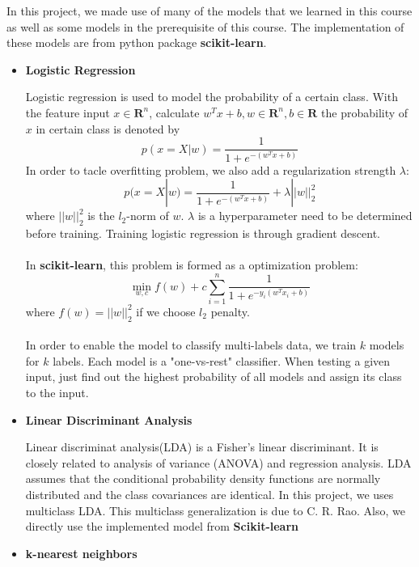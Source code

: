 \documentclass[11.5pt]{article}
\begin{document}
\begin{enumerate}
        In this project, we made use of many of the models that we learned in this course as well as some models in the prerequisite of this course. The implementation of these models are from python package \textbf{scikit-learn}\cite{scikit-learn}. 
            \begin{itemize}
                \item \textbf{Logistic Regression}
                
                Logistic regression is used to model the probability of a certain class. With the feature input $x \in \mathbf{R}^n$, calculate $w^Tx + b, w \in \mathbf{R}^n, b \in \mathbf{R}$ the probability of $x$ in certain class is denoted by 
                $$p(x = X | w) = \frac{1}{1 + e^{-(w^Tx + b)}}$$
                In order to tacle overfitting problem, we also add a regularization strength $\lambda$:
                $$p(x = X | w) = \frac{1}{1 + e^{-(w^Tx + b)}} + \lambda ||w||^2_2$$
                where $||w||_2^2$ is the $l_2$-norm of $w$. $\lambda$ is a hyperparameter need to be determined before training. Training logistic regression is through gradient descent. \\ \\
                In \textbf{scikit-learn}\cite{scikit-learn}, this problem is formed as a optimization problem: 
                $$\min_{w, c} f(w) + c\sum_{i=1}^{n}\frac{1}{1 + e^{-y_i(w^Tx_i + b)}} $$ 
                where $f(w) = ||w||^2_2$ if we choose $l_2$ penalty.\\ \\
                In order to enable the model to classify multi-labels data, we train $k$ models for $k$ labels. Each model is a "one-vs-rest" classifier. When testing a given input, just find out the highest probability of all models and assign its class to the input.
                \item \textbf{Linear Discriminant Analysis}
                
                Linear discriminat analysis(LDA) is a Fisher's linear discriminant\cite{fisherDA}. It is closely related to analysis of variance (ANOVA) and regression analysis. LDA assumes that the conditional probability density functions are normally distributed and the class covariances are identical.           In this project, we uses multiclass LDA. This multiclass generalization is due to C. R. Rao\cite{multiLDA}. Also, we directly use the implemented model from \textbf{Scikit-learn}\cite{scikit-learn}

                \item \textbf{k-nearest neighbors}
                

\end{itemize}
\end{enumerate}
\end{document}
